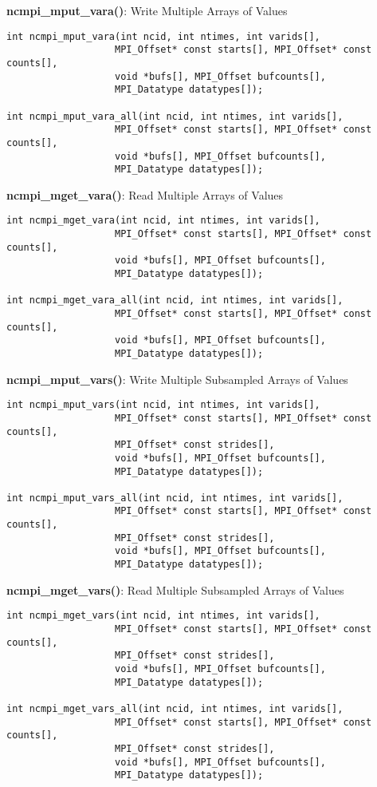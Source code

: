 {\bf ncmpi\_mput\_vara()}: Write Multiple Arrays of Values

\begin{verbatim}
int ncmpi_mput_vara(int ncid, int ntimes, int varids[],
                   MPI_Offset* const starts[], MPI_Offset* const counts[],
                   void *bufs[], MPI_Offset bufcounts[],
                   MPI_Datatype datatypes[]);

int ncmpi_mput_vara_all(int ncid, int ntimes, int varids[],
                   MPI_Offset* const starts[], MPI_Offset* const counts[],
                   void *bufs[], MPI_Offset bufcounts[],
                   MPI_Datatype datatypes[]);
\end{verbatim}


{\bf ncmpi\_mget\_vara()}: Read Multiple Arrays of Values

\begin{verbatim}
int ncmpi_mget_vara(int ncid, int ntimes, int varids[],
                   MPI_Offset* const starts[], MPI_Offset* const counts[],
                   void *bufs[], MPI_Offset bufcounts[],
                   MPI_Datatype datatypes[]);

int ncmpi_mget_vara_all(int ncid, int ntimes, int varids[],
                   MPI_Offset* const starts[], MPI_Offset* const counts[],
                   void *bufs[], MPI_Offset bufcounts[],
                   MPI_Datatype datatypes[]);
\end{verbatim}


{\bf ncmpi\_mput\_vars()}: Write Multiple Subsampled Arrays of Values

\begin{verbatim}
int ncmpi_mput_vars(int ncid, int ntimes, int varids[],
                   MPI_Offset* const starts[], MPI_Offset* const counts[],
                   MPI_Offset* const strides[],
                   void *bufs[], MPI_Offset bufcounts[],
                   MPI_Datatype datatypes[]);

int ncmpi_mput_vars_all(int ncid, int ntimes, int varids[],
                   MPI_Offset* const starts[], MPI_Offset* const counts[],
                   MPI_Offset* const strides[],
                   void *bufs[], MPI_Offset bufcounts[],
                   MPI_Datatype datatypes[]);
\end{verbatim}


{\bf ncmpi\_mget\_vars()}: Read Multiple Subsampled Arrays of Values

\begin{verbatim}
int ncmpi_mget_vars(int ncid, int ntimes, int varids[],
                   MPI_Offset* const starts[], MPI_Offset* const counts[],
                   MPI_Offset* const strides[],
                   void *bufs[], MPI_Offset bufcounts[],
                   MPI_Datatype datatypes[]);

int ncmpi_mget_vars_all(int ncid, int ntimes, int varids[],
                   MPI_Offset* const starts[], MPI_Offset* const counts[],
                   MPI_Offset* const strides[],
                   void *bufs[], MPI_Offset bufcounts[],
                   MPI_Datatype datatypes[]);
\end{verbatim}


